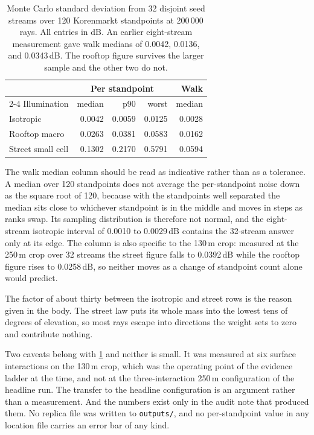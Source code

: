\documentclass[journal]{IEEEtran}
\begin{document}
\begin{table}[t]
  \centering
  \caption{Monte Carlo standard deviation from 32 disjoint seed streams over 120
  Korenmarkt standpoints at 200\,000 rays. All entries in dB. An earlier
  eight-stream measurement gave walk medians of 0.0042, 0.0136, and 0.0343\,dB.
  The rooftop figure survives the larger sample and the other two do not.}
  \label{tab:si-noise}
  \begin{tabular}{lrrrr}
    \toprule
    & \multicolumn{3}{c}{Per standpoint} & Walk \\
    \cmidrule(lr){2-4}
    Illumination & median & p90 & worst & median \\
    \midrule
    Isotropic          & 0.0042 & 0.0059 & 0.0125 & 0.0028 \\
    Rooftop macro      & 0.0263 & 0.0381 & 0.0583 & 0.0162 \\
    Street small cell  & 0.1302 & 0.2170 & 0.5791 & 0.0594 \\
    \bottomrule
  \end{tabular}
\end{table}

The walk median column should be read as indicative rather than as a tolerance.
A median over 120 standpoints does not average the per-standpoint noise down as
the square root of 120, because with the standpoints well separated the median
sits close to whichever standpoint is in the middle and moves in steps as ranks
swap. Its sampling distribution is therefore not normal, and the eight-stream
isotropic interval of 0.0010 to 0.0029\,dB contains the 32-stream answer only at
its edge. The column is also specific to the 130\,m crop: measured at the 250\,m
crop over 32 streams the street figure falls to 0.0392\,dB while the rooftop
figure rises to 0.0258\,dB, so neither moves as a change of standpoint count
alone would predict.

The factor of about thirty between the isotropic and street rows is the reason
given in the body. The street law puts its whole mass into the lowest tens of
degrees of elevation, so most rays escape into directions the weight sets to
zero and contribute nothing.

Two caveats belong with \cref{tab:si-noise} and neither is small. It was
measured at six surface interactions on the 130\,m crop, which was the operating
point of the evidence ladder at the time, and not at the three-interaction
250\,m configuration of the headline run. The transfer to the headline
configuration is an argument rather than a measurement. And the numbers exist
only in the audit note that produced them. No replica file was written to
\texttt{outputs/}, and no per-standpoint value in any location file carries an
error bar of any kind.
\end{document}

